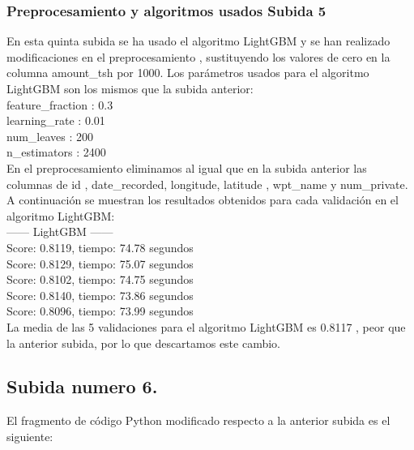 	\subsubsection[Preprocesamiento y algoritmos usados Subida 5]{Preprocesamiento y algoritmos usados Subida 5}
	
	En esta quinta subida se ha usado el algoritmo LightGBM y se han realizado modificaciones 
	en el preprocesamiento , sustituyendo los valores de cero en la columna amount\_tsh
	por 1000. Los parámetros usados para el algoritmo LightGBM son los mismos que la subida anterior: \\
	
	feature\_fraction : 0.3 \\
	learning\_rate : 0.01 \\
	num\_leaves : 200 \\
	n\_estimators : 2400 \\
	
	En el preprocesamiento eliminamos al igual que en la subida anterior las columnas de id , date\_recorded,
	longitude, latitude , wpt\_name y num\_private. A continuación se muestran los resultados 
	obtenidos para cada validación en el algoritmo LightGBM: \\

	------ LightGBM ------\\
	Score: 0.8119, tiempo:  74.78 segundos \\
	Score: 0.8129, tiempo:  75.07 segundos \\
	Score: 0.8102, tiempo:  74.75 segundos \\
	Score: 0.8140, tiempo:  73.86 segundos \\
	Score: 0.8096, tiempo:  73.99 segundos \\
	
	La media de las 5 validaciones para el algoritmo LightGBM es 0.8117 , peor que la anterior subida, por lo 
	que descartamos este cambio.  \\

	
	\subsection[Subida numero 6]{Subida numero 6.}
	
	El fragmento de código Python modificado respecto a la anterior subida es el siguiente:
	
